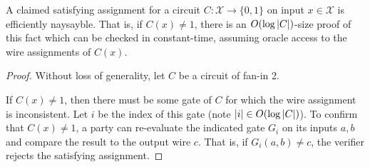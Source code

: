 \begin{lemma}\label{lemma:naysayingCSAT}
    A claimed satisfying assignment for a circuit $C: \mathcal{X} \to \{0,1\}$ on input $x \in \mathcal{X}$ is efficiently naysayble. That is, if $C(x) \neq 1$, there is an $O(\log{\lvert C \rvert})$-size proof of this fact which can be checked in constant-time, assuming oracle access to the wire assignments of $C(x)$.
\end{lemma}
\begin{proof}
    Without loss of generality, let $C$ be a circuit of fan-in 2. 
    
    If $C(x) \neq 1$, then there must be some gate of $C$ for which the wire assignment is inconsistent. Let $i$ be the index of this gate (note $\lvert i \rvert \in O(\log{\lvert C \rvert})$). To confirm that $C(x) \neq 1$, a party can re-evaluate the indicated gate $G_i$ on its inputs $a,b$ and compare the result to the output wire $c$. That is, if $G_i(a,b) \neq c$, the verifier rejects the satisfying assignment.
\end{proof}

